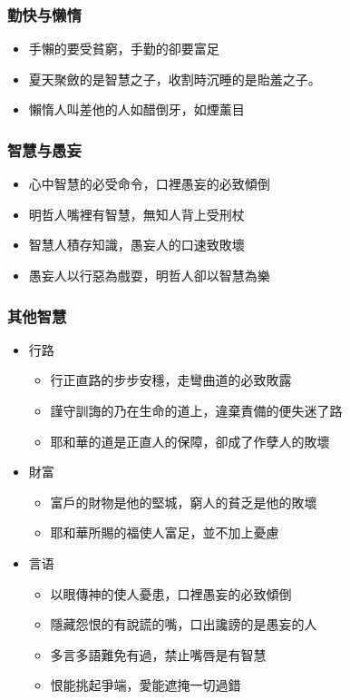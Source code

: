 \subsubsection{勤快与懒惰}
\begin{itemize}
\itemsep-.45em  
\item 手懶的要受貧窮，手勤的卻要富足
\item 夏天聚斂的是智慧之子，收割時沉睡的是貽羞之子。
\item 懶惰人叫差他的人如醋倒牙，如煙薰目 
\end{itemize}
\subsubsection{智慧与愚妄}
\begin{itemize}
\itemsep-.45em  
\item 心中智慧的必受命令，口裡愚妄的必致傾倒
\item 明哲人嘴裡有智慧，無知人背上受刑杖
\item 智慧人積存知識，愚妄人的口速致敗壞
\item 愚妄人以行惡為戲耍，明哲人卻以智慧為樂
\end{itemize}
\subsubsection{其他智慧}
\begin{itemize}
\itemsep-.45em 
\item 行路 
\begin{itemize}
\itemsep-.45em  
\item 行正直路的步步安穩，走彎曲道的必致敗露
\item 謹守訓誨的乃在生命的道上，違棄責備的便失迷了路
\item 耶和華的道是正直人的保障，卻成了作孽人的敗壞
\end{itemize}
\item 財富
\begin{itemize}
\itemsep-.45em 
\item 富戶的財物是他的堅城，窮人的貧乏是他的敗壞
\item 耶和華所賜的福使人富足，並不加上憂慮
\end{itemize}
\item 言语
\begin{itemize}
\itemsep-.45em 
\item 以眼傳神的使人憂患，口裡愚妄的必致傾倒
\item 隱藏怨恨的有說謊的嘴，口出讒謗的是愚妄的人
\item 多言多語難免有過，禁止嘴唇是有智慧
\item 恨能挑起爭端，愛能遮掩一切過錯
\end{itemize}
\end{itemize}

